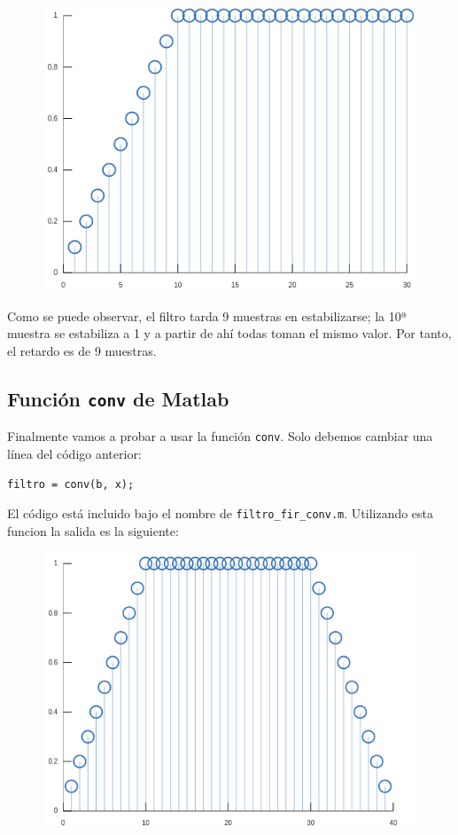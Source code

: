 \documentclass[11pt,a4paper]{article}
\begin{document}
\begin{figure}[H]
	\centering
	\includegraphics[scale=0.5]{img/fir-escalon-filter.png}
\end{figure}

Como se puede observar, el filtro tarda 9 muestras en estabilizarse; la 10ª muestra se estabiliza a 1 y a partir de ahí todas toman el mismo valor. Por tanto, el retardo es de 9 muestras.

\subsection{Función \texttt{conv} de Matlab}

Finalmente vamos a probar a usar la función \texttt{conv}. Solo debemos cambiar una línea del código anterior:

\begin{lstlisting}[frame=single]
filtro = conv(b, x);
\end{lstlisting}

El código está incluido bajo el nombre de \texttt{filtro\_fir\_conv.m}. Utilizando esta funcion la salida es la siguiente:

\begin{figure}[H]
	\centering
	\includegraphics[scale=0.5]{img/fir-conv.png}
\end{figure}
\end{document}
